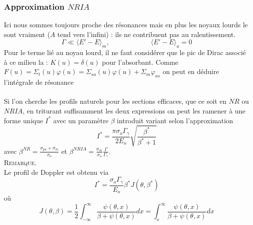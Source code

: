 	
	\subsubsection{Approximation $NRIA$}
	Ici nous sommes toujours proche des résonances mais en plus les noyaux lourds le sont vraiment
	($A$ tend vers l'infini) : ils ne contribuent pas au ralentissement.
	\begin{equation}
	\Gamma \ll \langle E'-E\rangle_m,\qquad\qquad\qquad \langle E'-E\rangle_a = 0
	\end{equation}
	Pour le terme lié au noyau lourd, il ne faut considérer que le pic de Dirac associé à ce 
	milieu la : $K(u) = \delta(u)$ pour l'absorbant. Comme 
	$F(u) = {\Sigma _t}(u)\varphi (u) = {\Sigma _{sa}}(u)\varphi (u) + {\Sigma _m}{\varphi _{as}}$ 
	on peut en déduire l'intégrale de résonance\\
	
	\ \\
	
	Si l'on cherche les profils naturels pour les sections efficaces, que ce soit en $NR$ ou $NRIA$, 
	en triturant suffisamment les deux expressions on peut les ramener à une forme unique $I^*$ avec 
	un paramètre $\beta$ introduit variant selon l'approximation
	\begin{equation}
	{I^*} = \frac{{\pi {\sigma _o}{\Gamma _\gamma }}}{{2{E_o}}}\sqrt {\frac{{{\beta ^*}}}{{{\beta ^*}
	 + 1}}} 
	\end{equation}
	avec ${\beta ^{NR}} = \frac{{{\sigma _{pa}} + {\sigma _m}}}{{{\sigma _o}}}$ et 
	${\beta ^{NRIA}} = \frac{{{\sigma _m}}}{{{\sigma _o}}}\frac{\Gamma }{{{\Gamma _\gamma }}}$.\\
	
	\textsc{Remarque}.\\
	Le profil de Doppler est obtenu via
	\begin{equation}
	{I^*} = \frac{{{\sigma _o}{\Gamma _\gamma }}}{{{E_o}}}{\beta ^*}J(\theta ,{\beta ^*})
	\end{equation}
	où 
	\begin{equation}
	J(\theta ,\beta ) = \frac{1}{2}\int_{ - \infty }^\infty  \frac{{\psi (\theta ,x)}}{{\beta  +
	 \psi (\theta ,x)}}dx  = \int_o^\infty     \frac{{\psi (\theta ,x)}}{{\beta  + \psi (\theta ,x)}}
	 dx
	\end{equation}\ 
	
